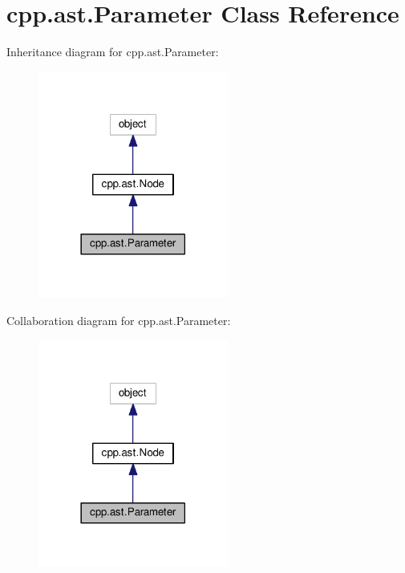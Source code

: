 \hypertarget{classcpp_1_1ast_1_1Parameter}{}\section{cpp.\+ast.\+Parameter Class Reference}
\label{classcpp_1_1ast_1_1Parameter}


Inheritance diagram for cpp.\+ast.\+Parameter\+:
\nopagebreak
\begin{figure}[H]
\begin{center}
\leavevmode
\includegraphics[width=177pt]{classcpp_1_1ast_1_1Parameter__inherit__graph}
\end{center}
\end{figure}


Collaboration diagram for cpp.\+ast.\+Parameter\+:
\nopagebreak
\begin{figure}[H]
\begin{center}
\leavevmode
\includegraphics[width=177pt]{classcpp_1_1ast_1_1Parameter__coll__graph}
\end{center}
\end{figure}
